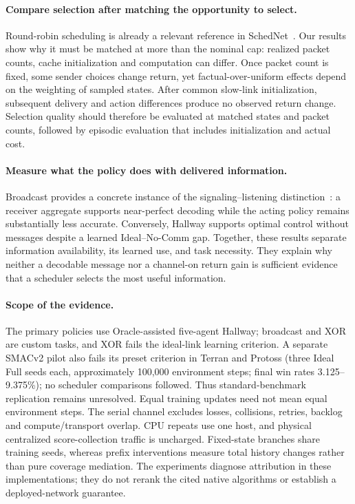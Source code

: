 \documentclass[10pt]{article}
\begin{document}
\paragraph{Compare selection after matching the opportunity to select.}
Round-robin scheduling is already a relevant reference in SchedNet~\citep{kim2019schedule}. Our results show why it must be matched at more than the nominal cap: realized packet counts, cache initialization and computation can differ. Once packet count is fixed, some sender choices change return, yet factual-over-uniform effects depend on the weighting of sampled states. After common slow-link initialization, subsequent delivery and action differences produce no observed return change. Selection quality should therefore be evaluated at matched states and packet counts, followed by episodic evaluation that includes initialization and actual cost.

\paragraph{Measure what the policy does with delivered information.}
Broadcast provides a concrete instance of the signaling--listening distinction~\citep{lowe2019pitfalls}: a receiver aggregate supports near-perfect decoding while the acting policy remains substantially less accurate. Conversely, Hallway supports optimal control without messages despite a learned Ideal--No-Comm gap. Together, these results separate information availability, its learned use, and task necessity. They explain why neither a decodable message nor a channel-on return gain is sufficient evidence that a scheduler selects the most useful information.

\paragraph{Scope of the evidence.}
The primary policies use Oracle-assisted five-agent Hallway; broadcast and XOR are custom tasks, and XOR fails the ideal-link learning criterion. A separate SMACv2 pilot also fails its preset criterion in Terran and Protoss (three Ideal Full seeds each, approximately 100,000 environment steps; final win rates 3.125--9.375\%); no scheduler comparisons followed. Thus standard-benchmark replication remains unresolved. Equal training updates need not mean equal environment steps. The serial channel excludes losses, collisions, retries, backlog and compute/transport overlap. CPU repeats use one host, and physical centralized score-collection traffic is uncharged. Fixed-state branches share training seeds, whereas prefix interventions measure total history changes rather than pure coverage mediation. The experiments diagnose attribution in these implementations; they do not rerank the cited native algorithms or establish a deployed-network guarantee.
\end{document}
